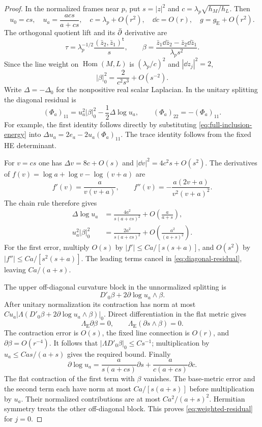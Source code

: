 \begin{proof}
In the normalized frames near \(p\), put \(s=|z|^2\) and
\(c=\lambda_p\sqrt{h_M/h_L}\). Then
\[
 u_0=cs,\quad u_a=\frac{acs}{a+cs},\quad
 c=\lambda_p+O(r^2),\quad \dd c=O(r),
 \quad g=g_{\mathrm E}+O(r^2).
\]
The orthogonal quotient lift and its \(\bar\partial\) derivative are
\begin{equation}\label{eq:normalized-splitting}
 \tau=\lambda_p^{-1/2}\frac{(\bar z_2,\bar z_1)^{\mathsf t}}s,
 \qquad
 \beta=\frac{\bar z_1\dd\bar z_2-\bar z_2\dd\bar z_1}
                  {\lambda_p s^2}.
\end{equation}
Since the line weight on \(\operatorname{Hom}(M,L)\) is
\((\lambda_p/c)^2\) and \(|\dd z_j|^2=2\),
\begin{equation}\label{eq:beta-leading}
 |\beta|_0^2=\frac{2}{c^2s^3}+O(s^{-2}).
\end{equation}
Write \(\Delta=-\Delta_0\) for the nonpositive real scalar
Laplacian. In the unitary splitting the diagonal residual is
\begin{equation}\label{eq:diagonal-residual}
 (\Phi_a)_{11}=u_a^2|\beta|_0^2-\frac12\Delta\log u_a,
 \qquad(\Phi_a)_{22}=-(\Phi_a)_{11}.
\end{equation}
For example, the first identity follows directly by substituting
\eqref{eq:full-inclusion-energy} into
\(\Delta u_a=2e_a-2u_a(\Phi_a)_{11}\). The trace identity follows
from the fixed HE determinant.

For \(v=cs\) one has
\(\Delta v=8c+O(s)\) and
\(|\dd v|^2=4c^2s+O(s^2)\). The derivatives of
\(f(v)=\log a+\log v-\log(v+a)\) are
\[
 f'(v)=\frac{a}{v(v+a)},\qquad
 f''(v)=-\frac{a(2v+a)}{v^2(v+a)^2}.
\]
The chain rule therefore gives
\begin{align}
 \Delta\log u_a
 &=\frac{4a^2}{s(a+cs)^2}
       +O\left(\frac{a}{a+s}\right),\\
 u_a^2|\beta|_0^2
 &=\frac{2a^2}{s(a+cs)^2}
       +O\left(\frac{a^2}{(a+s)^2}\right).
\end{align}
For the first error, multiply \(O(s)\) by
\(|f'|\le Ca/[s(s+a)]\), and \(O(s^2)\) by
\(|f''|\le Ca/[s^2(s+a)]\). The leading terms cancel in
\eqref{eq:diagonal-residual}, leaving \(Ca/(a+s)\).

The upper off-diagonal curvature block in the unnormalized
splitting is
\[
 D'_0\beta+2\partial\log u_a\wedge\beta.
\]
After unitary normalization its contraction has norm at most
\(Cu_a|\Lambda(D'_0\beta+2\partial\log u_a\wedge\beta)|_0\).
Direct differentiation in the flat metric gives
\[
 \Lambda_{\mathrm E}\partial\beta=0,\qquad
 \Lambda_{\mathrm E}(\partial s\wedge\beta)=0.
\]
The contraction error is \(O(s)\), the fixed line connection is
\(O(r)\), and \(\partial\beta=O(r^{-4})\). It follows that
\(|\Lambda D'_0\beta|_0\le Cs^{-1}\); multiplication by
\(u_a\le Cas/(a+s)\) gives the required bound. Finally
\[
 \partial\log u_a
 =\frac{a}{s(a+cs)}\partial s+
   \frac{a}{c(a+cs)}\partial c.
\]
The flat contraction of the first term with \(\beta\) vanishes.
The base-metric error and the second term each have norm at most
\(Ca/[s(a+s)]\) before multiplication by \(u_a\). Their
normalized contributions are at most \(Ca^2/(a+s)^2\).
Hermitian symmetry treats the other off-diagonal block. This
proves \eqref{eq:weighted-residual} for \(j=0\).


\end{proof}
